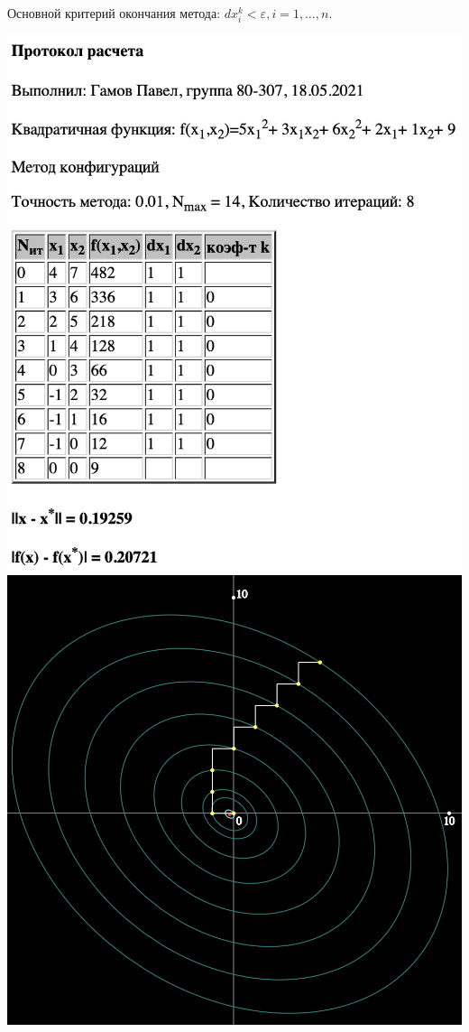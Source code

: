 Основной критерий окончания метода: $dx_{i}^{k} < \varepsilon, i = 1, \ldots, n$.

\includegraphics[width=\linewidth]{images/2_prot}\\
\includegraphics[width=\linewidth]{images/2_graf}\\

